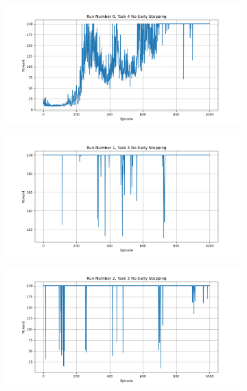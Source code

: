 \documentclass[runningheads]{llncs}
\begin{document}
\begin{figure}[H]
 \centering
 \begin{subfigure}{.45\textwidth}
     \centering
     \includegraphics[width=1\textwidth] {imgs/no_early_stopping/Task_4_run_0_no_es}
 \end{subfigure}%
 \begin{subfigure}{.45\textwidth}
     \centering
     \includegraphics[width=1\textwidth] {imgs/no_early_stopping/Task_3_run_1_no_es}
 \end{subfigure}
  \begin{subfigure}{.45\textwidth}
      \centering
      \includegraphics[width=1\textwidth] {imgs/no_early_stopping/Task_3_run_2_no_es}

\end{subfigure}
\end{figure}
\end{document}
